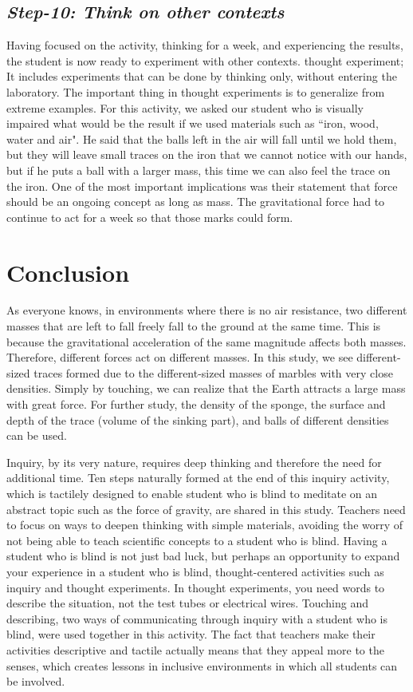 \documentclass[11.5pt]{sig-alternate}
\begin{document}
\begin{large}
\subsection*{\textit{Step-10: Think on other contexts}}
Having focused on the activity, thinking for a week, and experiencing the results, the student is now ready to experiment with other contexts. thought experiment; It includes experiments that can be done by thinking only, without entering the laboratory. The important thing in thought experiments is to generalize from extreme examples. For this activity, we asked our student who is visually impaired what would be the result if we used materials such as ``iron, wood, water and air". He said that the balls left in the air will fall until we hold them, but they will leave small traces on the iron that we cannot notice with our hands, but if he puts a ball with a larger mass, this time we can also feel the trace on the iron. One of the most important implications was their statement that force should be an ongoing concept as long as mass. The gravitational force had to continue to act for a week so that those marks could form.

\section*{Conclusion}
As everyone knows, in environments where there is no air resistance, two different masses that are left to fall freely fall to the ground at the same time. This is because the gravitational acceleration of the same magnitude affects both masses. Therefore, different forces act on different masses. In this study, we see different-sized traces formed due to the different-sized masses of marbles with very close densities. Simply by touching, we can realize that the Earth attracts a large mass with great force. For further study, the density of the sponge, the surface and depth of the trace (volume of the sinking part), and balls of different densities can be used. 

Inquiry, by its very nature, requires deep thinking and therefore the need for additional time. Ten steps naturally formed at the end of this inquiry activity, which is tactilely designed to enable student who is blind to meditate on an abstract topic such as the force of gravity, are shared in this study. Teachers need to focus on ways to deepen thinking with simple materials, avoiding the worry of not being able to teach scientific concepts to a student who is blind. Having a student who is blind is not just bad luck, but perhaps an opportunity to expand your experience in a student who is blind, thought-centered activities such as inquiry and thought experiments. In thought experiments, you need words to describe the situation, not the test tubes or electrical wires. Touching and describing, two ways of communicating through inquiry with a student who is blind, were used together in this activity. The fact that teachers make their activities descriptive and tactile actually means that they appeal more to the senses, which creates lessons in inclusive environments in which all students can be involved.


\end{large}
\end{document}
